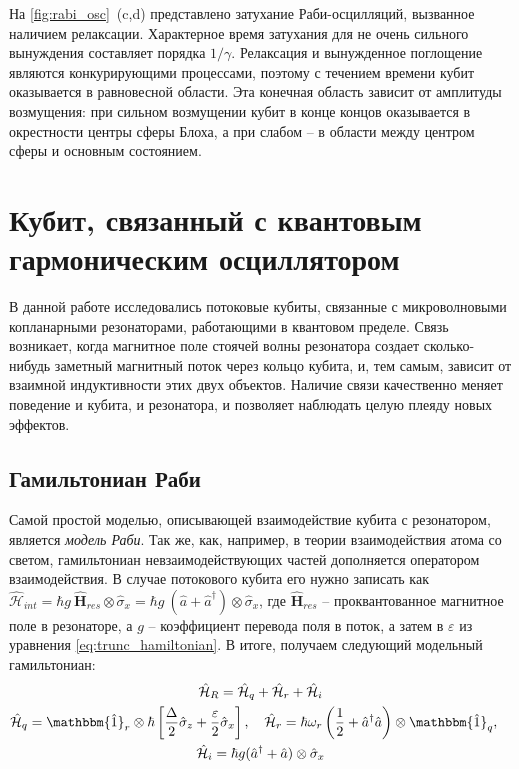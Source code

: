 \documentclass[12pt, twoside]{report}
\numberwithin{equation}{section}
\numberwithin{figure}{section}
\begin{document}
На \autoref{fig:rabi_osc}~(c,d) представлено затухание Раби-осцилляций, вызванное наличием релаксации. Характерное время затухания для не очень сильного вынуждения составляет порядка $1/\gamma$. Релаксация и вынужденное поглощение являются конкурирующими процессами, поэтому с течением времени кубит оказывается в равновесной области. Эта конечная область зависит от амплитуды возмущения: при сильном возмущении кубит в конце концов оказывается в окрестности центры сферы Блоха, а при слабом -- в области между центром сферы и основным состоянием.

\section{Кубит, связанный с квантовым гармоническим осциллятором}

В данной работе исследовались потоковые кубиты, связанные с микроволновыми копланарными резонаторами, работающими в квантовом пределе. Связь возникает, когда магнитное поле стоячей волны резонатора создает сколько-нибудь заметный магнитный поток через кольцо кубита, и, тем самым, зависит от взаимной индуктивности этих двух объектов. Наличие связи качественно меняет поведение и кубита, и резонатора, и позволяет наблюдать целую плеяду новых эффектов.

\subsection{Гамильтониан Раби}

Самой простой моделью, описывающей взаимодействие кубита с резонатором, является \textit{модель Раби}. Так же, как, например, в теории взаимодействия атома со светом, гамильтониан невзаимодействующих частей дополняется оператором взаимодействия. В случае потокового кубита его нужно записать как $\mathcal{\hat H}_{int} = \hbar g\ \mathbf{\hat H}_{res} \otimes \hat \sigma_x = \hbar g\ (\hat a + \hat a^{\dag})\otimes \hat \sigma_x$, где $\mathbf{\hat H}_{res}$ -- проквантованное магнитное поле в резонаторе, а $g$ -- коэффициент перевода поля в поток, а затем в $\varepsilon$ из уравнения \eqref{eq:trunc_hamiltonian}. В итоге, получаем следующий модельный гамильтониан:
\begin{equation}
\begin{gathered}
	\mathcal{\hat H}_R = \hat{\mathcal{H}}_{q}+\hat{\mathcal{H}}_{r}+\hat{\mathcal{H}}_{i} \\
	\hat{\mathcal{H}}_{q} = \mathbbm{\hat 1}_r \otimes \hbar\left[\frac{\Delta}{2} \hat \sigma_z + 				\frac{\varepsilon}{2} \hat \sigma_x \right], \quad
	\hat{\mathcal{H}}_{r} = \hbar \omega_r \left(\frac{1}{2}+\hat a^\dag \hat a \right) \otimes \mathbbm{\hat 1}_q, \quad \\
	\hat{\mathcal{H}}_i = \hbar g (\hat a^\dag + \hat a) \otimes \hat \sigma_x
\end{gathered}
\label{eq:rabi_hamiltonian}
\end{equation}
\end{document}
